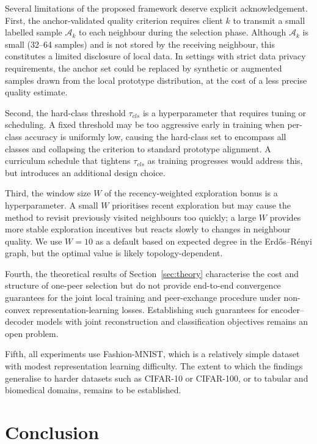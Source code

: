 \documentclass[conference]{IEEEtran}
\begin{document}
Several limitations of the proposed framework deserve explicit acknowledgement. First, the anchor-validated quality criterion requires client \(k\) to transmit a small labelled sample \(\mathcal{A}_k\) to each neighbour during the selection phase. Although \(\mathcal{A}_k\) is small (32--64 samples) and is not stored by the receiving neighbour, this constitutes a limited disclosure of local data. In settings with strict data privacy requirements, the anchor set could be replaced by synthetic or augmented samples drawn from the local prototype distribution, at the cost of a less precise quality estimate.

Second, the hard-class threshold \(\tau_{cls}\) is a hyperparameter that requires tuning or scheduling. A fixed threshold may be too aggressive early in training when per-class accuracy is uniformly low, causing the hard-class set to encompass all classes and collapsing the criterion to standard prototype alignment. A curriculum schedule that tightens \(\tau_{cls}\) as training progresses would address this, but introduces an additional design choice.

Third, the window size \(W\) of the recency-weighted exploration bonus is a hyperparameter. A small \(W\) prioritises recent exploration but may cause the method to revisit previously visited neighbours too quickly; a large \(W\) provides more stable exploration incentives but reacts slowly to changes in neighbour quality. We use \(W = 10\) as a default based on expected degree in the Erd\H{o}s--R\'{e}nyi graph, but the optimal value is likely topology-dependent.

Fourth, the theoretical results of Section~\ref{sec:theory} characterise the cost and structure of one-peer selection but do not provide end-to-end convergence guarantees for the joint local training and peer-exchange procedure under non-convex representation-learning losses. Establishing such guarantees for encoder--decoder models with joint reconstruction and classification objectives remains an open problem.

Fifth, all experiments use Fashion-MNIST, which is a relatively simple dataset with modest representation learning difficulty. The extent to which the findings generalise to harder datasets such as CIFAR-10 or CIFAR-100, or to tabular and biomedical domains, remains to be established.


\section{Conclusion}
\label{sec:conclusion}
\end{document}
